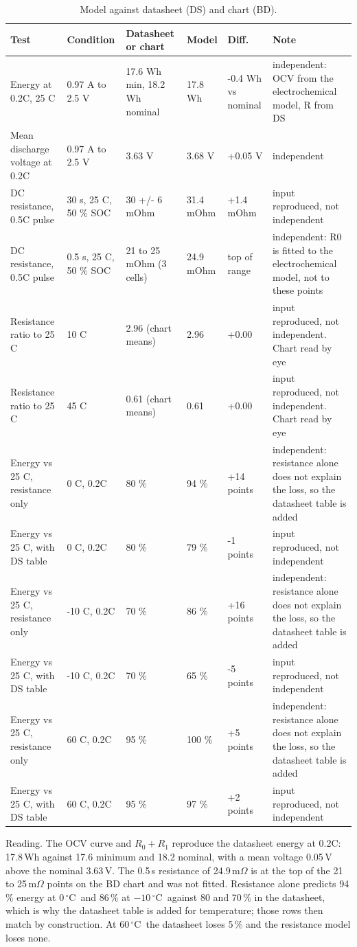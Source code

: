 \documentclass[11pt,a4paper]{article}
\newcommand{\degC}{\ensuremath{{}^{\circ}\mathrm{C}}}
\begin{document}
\begin{table}[H]
\centering\scriptsize
\begin{tabular}{@{}p{3.0cm}p{2.0cm}p{2.5cm}p{1.5cm}p{1.8cm}p{4.0cm}@{}}
\toprule
Test & Condition & Datasheet or chart & Model & Diff. & Note \\
\midrule
Energy at 0.2C, 25 C & 0.97 A to 2.5 V & 17.6 Wh min, 18.2 Wh nominal & 17.8 Wh & -0.4 Wh vs nominal & independent: OCV from the electrochemical model, R from DS \\
Mean discharge voltage at 0.2C & 0.97 A to 2.5 V & 3.63 V & 3.68 V & +0.05 V & independent \\
DC resistance, 0.5C pulse & 30 s, 25 C, 50 \% SOC & 30 +/- 6 mOhm & 31.4 mOhm & +1.4 mOhm & input reproduced, not independent \\
DC resistance, 0.5C pulse & 0.5 s, 25 C, 50 \% SOC & 21 to 25 mOhm (3 cells) & 24.9 mOhm & top of range & independent: R0 is fitted to the electrochemical model, not to these points \\
Resistance ratio to 25 C & 10 C & 2.96 (chart means) & 2.96 & +0.00 & input reproduced, not independent. Chart read by eye \\
Resistance ratio to 25 C & 45 C & 0.61 (chart means) & 0.61 & +0.00 & input reproduced, not independent. Chart read by eye \\
Energy vs 25 C, resistance only & 0 C, 0.2C & 80 \% & 94 \% & +14 points & independent: resistance alone does not explain the loss, so the datasheet table is added \\
Energy vs 25 C, with DS table & 0 C, 0.2C & 80 \% & 79 \% & -1 points & input reproduced, not independent \\
Energy vs 25 C, resistance only & -10 C, 0.2C & 70 \% & 86 \% & +16 points & independent: resistance alone does not explain the loss, so the datasheet table is added \\
Energy vs 25 C, with DS table & -10 C, 0.2C & 70 \% & 65 \% & -5 points & input reproduced, not independent \\
Energy vs 25 C, resistance only & 60 C, 0.2C & 95 \% & 100 \% & +5 points & independent: resistance alone does not explain the loss, so the datasheet table is added \\
Energy vs 25 C, with DS table & 60 C, 0.2C & 95 \% & 97 \% & +2 points & input reproduced, not independent \\
\bottomrule
\end{tabular}
\caption{Model against datasheet (DS) and chart (BD).}
\end{table}
Reading. The OCV curve and $R_0+R_1$ reproduce the datasheet energy at 0.2C: 17.8\,Wh against 17.6 minimum and 18.2 nominal, with a mean voltage 0.05\,V above the nominal 3.63\,V. The 0.5\,s resistance of 24.9\,m$\Omega$ is at the top of the 21 to 25\,m$\Omega$ points on the BD chart and was not fitted. Resistance alone predicts 94\,\% energy at 0\,\degC\ and 86\,\% at $-10$\,\degC\ against 80 and 70\,\% in the datasheet, which is why the datasheet table is added for temperature; those rows then match by construction. At 60\,\degC\ the datasheet loses 5\,\% and the resistance model loses none.
\end{document}
